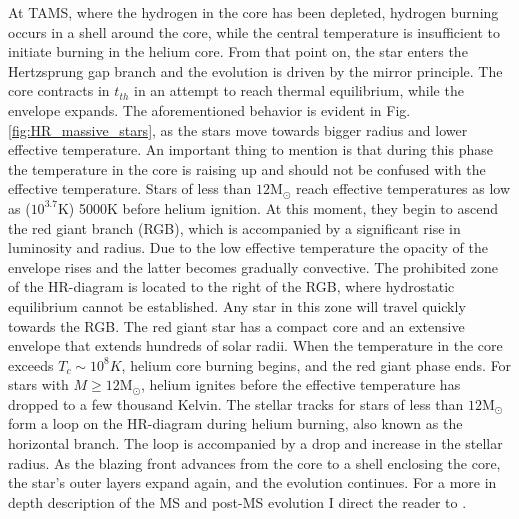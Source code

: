 At TAMS, where the hydrogen in the core has been depleted, hydrogen burning occurs in a shell around the core, while the central temperature is insufficient to initiate burning in the helium core. From that point on, the star enters the Hertzsprung gap branch and the evolution is driven by the mirror principle. The core contracts in $t_{th}$ in an attempt to reach thermal equilibrium, while the envelope expands. The aforementioned behavior is evident in Fig.\ref{fig:HR_massive_stars}, as the stars move towards bigger radius and lower effective temperature. An important thing to mention is that during this phase the temperature in the core is raising up and should not be confused with the effective temperature. Stars of less than $12$M$_{\odot}$ reach effective temperatures as low as ($10^{3.7}$K) 5000K before helium ignition. At this moment, they begin to ascend the red giant branch (RGB), which is accompanied by a significant rise in luminosity and radius. Due to the low effective temperature the opacity of the envelope rises and the latter becomes gradually convective. The prohibited zone of the HR-diagram is located to the right of the RGB, where hydrostatic equilibrium cannot be established. Any star in this zone will travel quickly towards the RGB. The red giant star has a compact core and an extensive envelope that extends hundreds of solar radii. When the temperature in the core exceeds $T_c \sim 10^8 K$, helium core burning begins, and the red giant phase ends. For stars with $M \geq 12$M$_{\odot}$, helium ignites before the effective temperature has dropped to a few thousand Kelvin. The stellar tracks for stars of less than $12$M$_{\odot}$ form a loop on the HR-diagram during helium burning, also known as the horizontal branch. The loop is accompanied by a drop and increase in the stellar radius. As the blazing front advances from the core to a shell enclosing the core, the star's outer layers expand again, and the evolution continues. For a more in depth description of the MS and post-MS evolution I direct the reader to \cite{pols2011stellar}.


